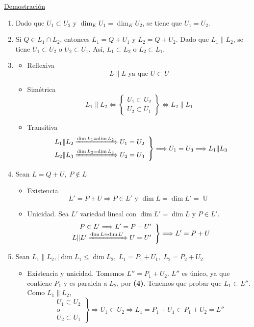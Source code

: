 \documentclass[12pt, a4paper, ones, notitlepage, openany,titlepage]{article}
\begin{document}
\noindent\underline{Demostración}
\begin{enumerate}[label=(\arabic*)]
\item Dado que $U_{1} \subset U_{2}$ y $\dim _{K} U_{1}=\dim _{K} U_{2}$, se tiene que $U_{1}=U_{2}$.

\item Si $Q \in L_{1} \cap L_{2}$, entonces $L_{1}=Q+U_{1}$ y $L_{2}=Q+U_{2}$. Dado que $L_{1} \| L_{2}$, se tiene $U_{1} \subset U_{2}$ o $U_{2} \subset U_{1}$. Así, $L_{1} \subset L_{2}$ o $L_{2} \subset L_{1}$.

\item \begin{itemize}
	\item Reflexiva
	$$
	L \| L \text{ ya que } U \subset U
	$$
	\item Simétrica
	$$
	L_1 \| L_2 \Longleftrightarrow \left\{\begin{array}{r}
		U_1 \subset U_2 \\
		U_2 \subset U_1
	\end{array}\right\} \Longleftrightarrow L_2 \| L_1
	$$
	\item Transitiva
	$$
	\left.\begin{array}{r}
		L_1 \| L_2 \xRightarrow{\dim L_1 = \dim L_2} U_1 = U_2 \\
		L_2 \| L_3 \xRightarrow{\dim L_2 = \dim L_3} U_2 = U_3
	\end{array}\right\} \Longrightarrow U_1 = U_3 \Longrightarrow L_1 \| L_3
	$$
\end{itemize}

\item Sean $L = Q + U, \; P \notin L$
\begin{itemize}
	\item Existencia
	$$
	L' = P + U \Longrightarrow P \in L' \text{ y } \dim L = \dim L' = \operatorname{U}
	$$
	\item Unicidad. Sea $L'$ variedad lineal con $\dim L' = \dim L$ y $P \in L'$.
	$$
	\left.\begin{array}{r}
		P \in L' \Longrightarrow L' = P + U' \\
		L \| L' \xRightarrow{\dim L = \dim L'} U = U'
	\end{array}\right\} \Longrightarrow L' = P + U
	$$
\end{itemize}

\item Sean $L_1 \| L_2, \mid \dim L_1 \le \dim  L_2, \; L_1 = P_1 + U_1, \; L_2 = P_2 + U_2$
\begin{itemize}
	\item Existencia y unicidad. Tomemos $L'' = P_1 + U_2$. $L''$ es único, ya que contiene $P_1$ y es paralela a $L_2$, por \textbf{(4)}. Tenemos que probar que $L_1 \subset L''$. Como $L_1 \| L_2$,
	$$
	\left.\begin{array}{r}
		U_1 \subset U_2  \\
		\text{o} \\
		U_2 \subset U_1
	\end{array}\right\} \Longrightarrow U_1 \subset U_2 \Longrightarrow L_1 = P_1 + U_1 \subset P_1 + U_2 = L''
	$$
\end{itemize}
\end{enumerate}
\end{document}
